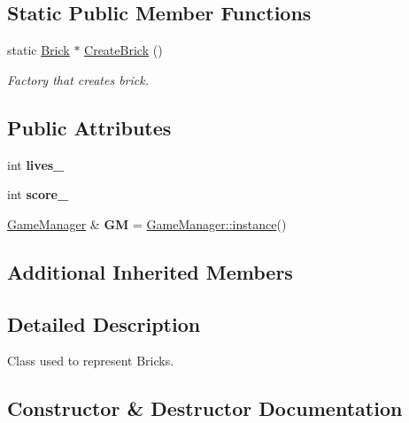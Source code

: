 \subsection*{Static Public Member Functions}
\begin{DoxyCompactItemize}
\item 
static \hyperlink{class_brick}{Brick} $\ast$ \hyperlink{class_brick_aa7612e167304813054c4de49a29c2201}{Create\+Brick} ()
\begin{DoxyCompactList}\small\item\em Factory that creates brick. \end{DoxyCompactList}\end{DoxyCompactItemize}
\subsection*{Public Attributes}
\begin{DoxyCompactItemize}
\item 
\mbox{\label{class_brick_a012655123280a597376888d88215c40a}} 
int {\bfseries lives\+\_\+}
\item 
\mbox{\label{class_brick_a9f21d16b211acd69e0ea121d0ee8b10b}} 
int {\bfseries score\+\_\+}
\item 
\mbox{\label{class_brick_a6fc2e95b7409dfc74488c1c5af27107c}} 
\hyperlink{class_game_manager}{Game\+Manager} \& {\bfseries GM} = \hyperlink{class_game_manager_afa37ab23c040b5225d567d4c9ab854e1}{Game\+Manager\+::instance}()
\end{DoxyCompactItemize}
\subsection*{Additional Inherited Members}


\subsection{Detailed Description}
Class used to represent Bricks. 

\subsection{Constructor \& Destructor Documentation}
\mbox{\label{class_brick_a8e1f06c7d5ba84454515f016c907098c}} 
